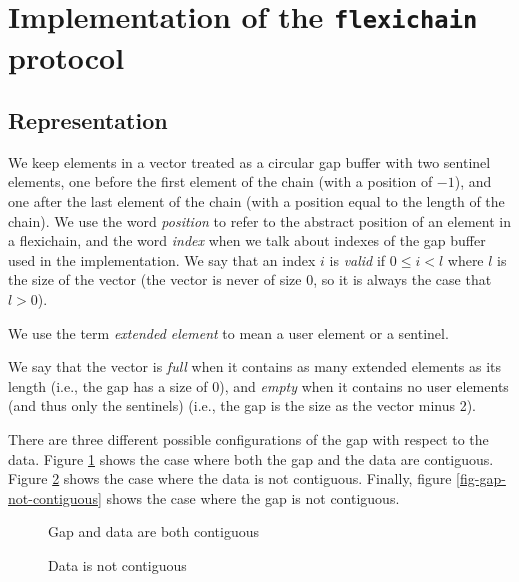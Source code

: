 \documentclass[11pt]{article}
\def\inputfig#1{}
\begin{document}
\section{Implementation of the \texttt{flexichain} protocol}

\subsection{Representation}

We keep elements in a vector treated as a circular gap buffer with two
sentinel elements, one before the first element of the chain (with a
position of $-1$), and one after the last element of the chain (with a
position equal to the length of the chain).  We use the word
\textit{position} to refer to the abstract position of an element in a
flexichain, and the word \textit{index} when we talk about indexes of
the gap buffer used in the implementation.  We say that an index $i$
is \emph{valid} if $0 \le i < l$ where $l$ is the size of the vector
(the vector is never of size $0$, so it is always the case that $l >
0$).

We use the term \emph{extended element} to mean a user element or a
sentinel. 

We say that the vector is \textit{full} when it contains as many
extended elements as its length (i.e., the gap has a size of $0$), and
\textit{empty} when it contains no user elements (and thus only the
sentinels) (i.e., the gap is the size as the vector minus
2).

There are three different possible configurations of the gap with
respect to the data.  Figure \ref{fig-both-contiguous} shows the case
where both the gap and the data are contiguous.  Figure
\ref{fig-data-not-contiguous} shows the case where the data is not
contiguous.  Finally, figure \ref{fig-gap-not-contiguous} shows the
case where the gap is not contiguous. 

\begin{figure}
\begin{center}
\inputfig{gap1.pstex_t}
\end{center}
\caption{\label{fig-both-contiguous} Gap and data are both contiguous}
\end{figure}

\begin{figure}
\begin{center}
\inputfig{gap2.pstex_t}
\end{center}
\caption{\label{fig-data-not-contiguous} Data is not contiguous}
\end{figure}
\end{document}
